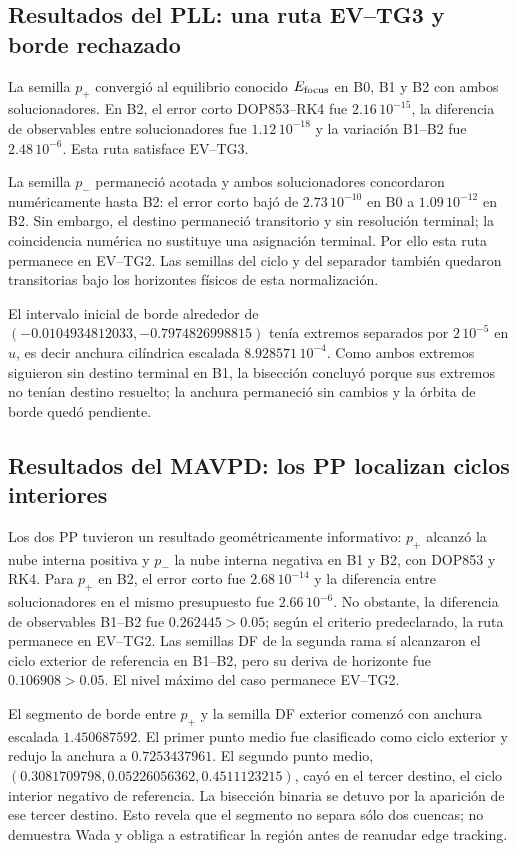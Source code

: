 \subsection{Resultados del PLL: una ruta EV--TG3 y borde rechazado}
\label{subsec:pilot-pll-results}

La semilla $p_+$ convergió al equilibrio conocido $E_{\rm focus}$ en B0, B1 y
B2 con ambos solucionadores. En B2, el error corto DOP853--RK4 fue
$2.16\,10^{-15}$, la diferencia de observables entre solucionadores fue
$1.12\,10^{-18}$ y la variación B1--B2 fue $2.48\,10^{-6}$. Esta ruta satisface
EV--TG3.

La semilla $p_-$ permaneció acotada y ambos solucionadores concordaron
numéricamente hasta B2: el error corto bajó de $2.73\,10^{-10}$ en B0 a
$1.09\,10^{-12}$ en B2. Sin embargo, el destino permaneció transitorio y sin
resolución terminal; la coincidencia numérica no sustituye una
asignación terminal. Por ello esta ruta permanece en EV--TG2. Las semillas del
ciclo y del separador también quedaron transitorias bajo los horizontes físicos
de esta normalización.

\ifHAFOBasinMaterial
El intervalo inicial de borde alrededor de
$(-0.0104934812033,-0.7974826998815)$ tenía extremos separados por
$2\,10^{-5}$ en $u$, es decir anchura cilíndrica escalada
$8.928571\,10^{-4}$. Como ambos extremos siguieron sin destino terminal en B1,
la bisección concluyó porque sus extremos no tenían destino resuelto; la
anchura permaneció sin cambios y la órbita de borde quedó pendiente.
\fi

\subsection{Resultados del MAVPD: los PP localizan ciclos interiores}
\label{subsec:pilot-mavpd-results}

Los dos PP tuvieron un resultado geométricamente informativo: $p_+$ alcanzó
la nube interna positiva y $p_-$ la nube interna negativa en B1 y B2, con
DOP853 y RK4.
Para $p_+$ en B2, el error corto fue $2.68\,10^{-14}$ y la diferencia entre
solucionadores en el mismo presupuesto fue $2.66\,10^{-6}$. No obstante, la
diferencia de observables B1--B2 fue $0.262445>0.05$; según el criterio
predeclarado, la ruta permanece en EV--TG2. Las semillas DF de la segunda
rama sí alcanzaron el ciclo exterior de referencia en B1--B2, pero su deriva de
horizonte fue $0.106908>0.05$. El nivel máximo del caso permanece EV--TG2.

\ifHAFOBasinMaterial
El segmento de borde entre $p_+$ y la semilla DF exterior comenzó con anchura
escalada $1.450687592$. El primer punto medio fue clasificado como ciclo
exterior y redujo la anchura a $0.7253437961$. El segundo punto medio,
$(0.3081709798,0.05226056362,0.4511123215)$, cayó en el tercer destino, el ciclo
interior negativo de referencia. La bisección binaria se detuvo por la aparición
de ese tercer destino. Esto revela que el segmento no separa sólo dos
cuencas; no demuestra Wada y obliga a estratificar la región antes de reanudar
edge tracking.
\fi

